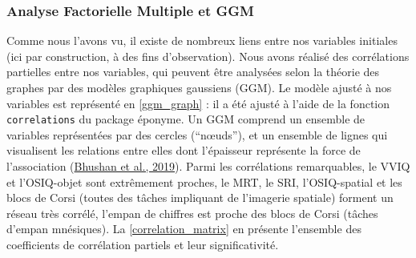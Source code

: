 \documentclass[
  12pt,
]{article}
\begin{document}
\hypertarget{analyse-factorielle-multiple-et-ggm}{%
\subsubsection{Analyse Factorielle Multiple et
GGM}\label{analyse-factorielle-multiple-et-ggm}}

Comme nous l'avons vu, il existe de nombreux liens entre nos variables
initiales (ici par construction, à des fins d'observation). Nous avons
réalisé des corrélations partielles entre nos variables, qui peuvent
être analysées selon la théorie des graphes par des modèles graphiques
gaussiens (GGM). Le modèle ajusté à nos variables est représenté en
\autoref{ggm_graph} : il a été ajusté à l'aide de la fonction
\texttt{correlations} du package éponyme. Un GGM comprend un ensemble de
variables représentées par des cercles (``nœuds''), et un ensemble de
lignes qui visualisent les relations entre elles dont l'épaisseur
représente la force de l'association
(\protect\hyperlink{ref-bhushanUsingGaussianGraphical2019}{Bhushan et
al., 2019}). Parmi les corrélations remarquables, le VVIQ et
l'OSIQ-objet sont extrêmement proches, le MRT, le SRI, l'OSIQ-spatial et
les blocs de Corsi (toutes des tâches impliquant de l'imagerie spatiale)
forment un réseau très corrélé, l'empan de chiffres est proche des blocs
de Corsi (tâches d'empan mnésiques). La \autoref{correlation_matrix} en
 présente l'ensemble des coefficients de corrélation
partiels et leur significativité.
\end{document}
